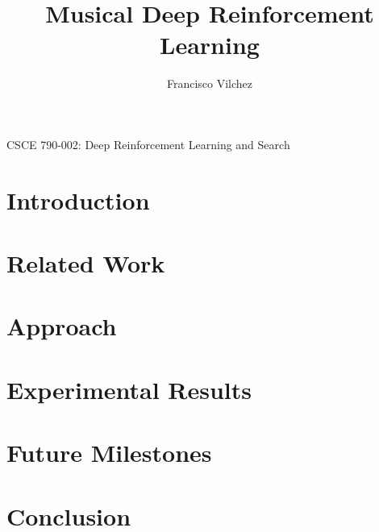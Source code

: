 \documentclass[]{article}
\title{Musical Deep Reinforcement Learning}
\author{Francisco Vilchez}
\makeatletter
\renewcommand\maketitle {
  \begin{center}
    {\Large{\course}}
    \medskip\par\noindent
    {\Large\textbf{\@title}}
    \medskip\par\noindent
    {\Large\@author}
    \medskip\par\noindent
    {\Large\@date}
    \bigskip\par\noindent
  \end{center}
}
\newcommand{\course}{CSCE 790-002: Deep Reinforcement Learning and Search}
\makeatother
\begin{document}
\maketitle






\section*{Introduction}


\section*{Related Work}


\section*{Approach}


\section*{Experimental Results}


\section*{Future Milestones}


\section*{Conclusion}




\end{document}
